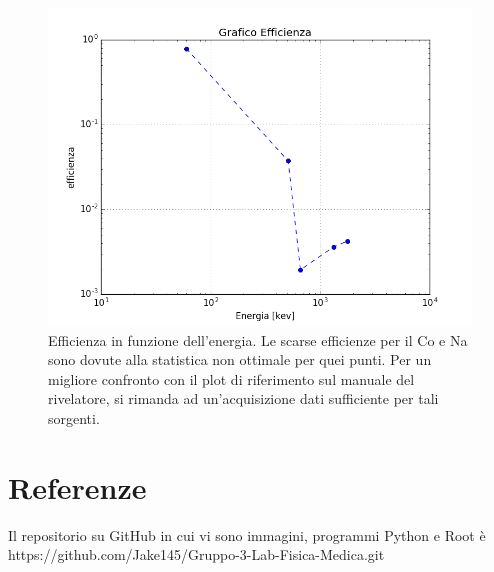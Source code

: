 \documentclass[a4paper]{article}
\begin{document}
\begin{figure}[H]
\includegraphics[width=1\textwidth]{efficiency}
        \caption{Efficienza in funzione dell'energia. Le scarse efficienze per il Co e Na sono dovute alla statistica non ottimale per quei punti. Per un migliore confronto con il plot di riferimento sul manuale del rivelatore, si rimanda ad un'acquisizione dati sufficiente per tali sorgenti.}
        \label{fig:2}
\end{figure}
\section{Referenze}
Il repositorio su GitHub in cui vi sono immagini, programmi Python e Root è
https://github.com/Jake145/Gruppo-3-Lab-Fisica-Medica.git
\end{document}
